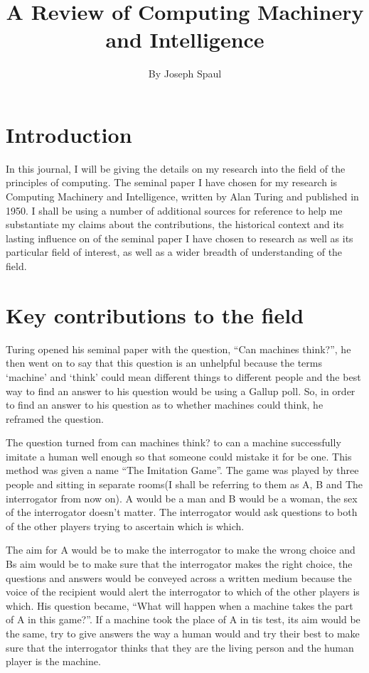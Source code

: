 \documentclass{article}
\title{A Review of Computing Machinery and Intelligence}
\author{By Joseph Spaul}
\begin{document}
\maketitle

\section{Introduction}

In this journal, I will be giving the details on my research into the field of the principles of computing. 
The seminal paper I have chosen for my research is Computing Machinery and Intelligence, written by Alan Turing 
and published in 1950. I shall be using a number of additional sources for reference to help me substantiate my 
claims about the contributions, the historical context and its lasting influence on of the seminal paper I have 
chosen to research as well as its particular field of interest, as well as a wider breadth of understanding of 
the field.

\section{Key contributions to the field}

Turing opened his seminal paper with the question, “Can machines think?”, he then went on to say that this 
question is an unhelpful because the terms ‘machine’ and ‘think’ could mean different things to different 
people and the best way to find an answer to his question would be using a Gallup poll. So, in order to find 
an answer to his question as to whether machines could think, he reframed the question. 

The question turned from can machines think? to can a machine successfully imitate a human well enough so that 
someone could mistake it for be one. This method was given a name “The Imitation Game”. The game was played by 
three people and sitting in separate rooms(I shall be referring to them as A, B and The interrogator from now 
on). A would be a man and B would be a woman, the sex of the interrogator doesn’t matter. The interrogator would 
ask questions to both of the other players trying to ascertain which is which. 

The aim for A would be to make the interrogator to make the wrong choice and Bs aim would be to make sure that the interrogator makes the right choice, the questions and answers would be conveyed across a written medium because 
the voice of the recipient would alert the interrogator to which of the other players is which. His question 
became, “What will happen when a machine takes the part of A in this game?”. If a machine took the place of A in 
tis test, its aim would be the same, try to give answers the way a human would and try their best to make sure that 
the interrogator thinks that they are the living person and the human player is the machine. 
\end{document}
